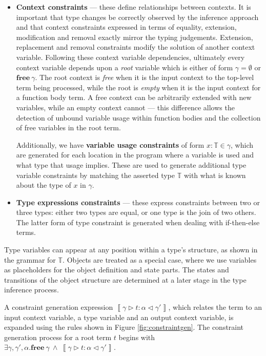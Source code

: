 \documentclass[preprint]{sigplanconf}
\newcommand{\figref}[1]{Figure \ref{#1}}
\newcommand{\inferlhs}[1]{\left\llbracket \gamma \triangleright #1 : \alpha \triangleleft \gamma' \right\rrbracket}
\newcommand{\cand}{\:\wedge\:}
\newcommand{\free}[1]{\mathbf{free}\:#1}
\begin{document}
\begin{itemize}
\item {\bf Context constraints} --- these define relationships between contexts.
It is important that type changes be correctly observed by the inference
approach and that context constraints expressed in terms of equality, extension,
modification and removal exactly mirror the typing judgements. 
Extension, replacement and removal constraints modify the solution of
another context variable. Following these context variable dependencies,
ultimately every context variable depends upon a {\it root} variable which
is either of form $\gamma = \emptyset$ or $\free{\gamma}$. The root
context is {\it free} when it is the input context to the top-level term being
processed, while
the root is {\it empty} when it is the input context for a function body term.
A free context can be arbitrarily extended with new variables, while an
empty context cannot --- this difference allows the detection of unbound
variable usage within function bodies and the collection of free variables
in the root term.

Additionally, we have {\bf variable usage constraints} of form 
$x : \mathbb{T} \in \gamma$, which are generated for each location in the
program where a variable is used and what type that usage implies. These
are used to generate additional type variable
constraints by matching the asserted type $\mathbb{T}$ with what is known
about the type of $x$ in $\gamma$.

\item {\bf Type expressions constraints} --- these express 
constraints between two or three types: either two types are equal,
or one type is the join of two others. The latter form of type constraint
is generated when dealing with if-then-else terms.
\end{itemize}

Type variables can appear at any position within a type's structure, as shown
in the grammar for $\mathbb{T}$. Objects are treated as a special case, where
we use variables as placeholders for the object definition and state parts.
The states and transitions of the object structure are determined at a later
stage in the type inference process.

A constraint generation expression $\inferlhs{t}$, which relates the term
to an input context variable, a type variable and an output context variable, 
is expanded using the rules shown in \figref{fig:constraintgen}.
The constraint generation process for a root term $t$ begins with
$\exists \gamma, \gamma', \alpha. \free{\gamma} \cand \inferlhs{t}$.
\end{document}
